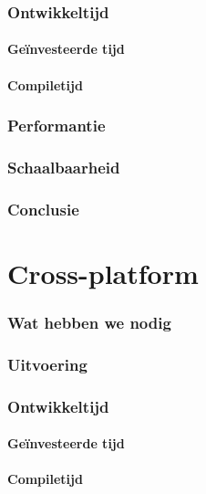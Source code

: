 \subsubsection{Ontwikkeltijd}

\paragraph{Geïnvesteerde tijd}

\paragraph{Compiletijd}

\subsubsection{Performantie}

\subsubsection{Schaalbaarheid}

\subsubsection{Conclusie}


\section{Cross-platform}
\subsubsection{Wat hebben we nodig}

\subsubsection{Uitvoering}

\subsubsection{Ontwikkeltijd}

\paragraph{Geïnvesteerde tijd}

\paragraph{Compiletijd}

